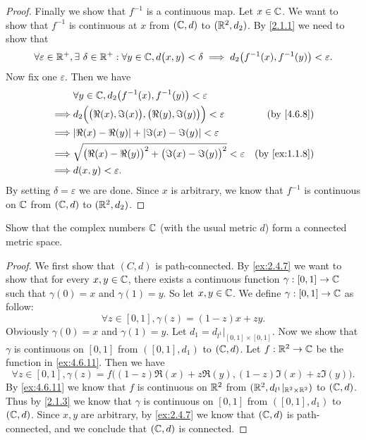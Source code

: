 \begin{proof}
  Finally we show that \(f^{-1}\) is a continuous map.
  Let \(x \in \mathbb{C}\).
  We want to show that \(f^{-1}\) is continuous at \(x\) from \((\mathbb{C}, d)\) to \((\mathbb{R}^2, d_2)\).
  By \cref{2.1.1} we need to show that
  \[
    \forall \varepsilon \in \mathbb{R}^+, \exists\ \delta \in \mathbb{R}^+ : \forall y \in \mathbb{C}, d\big(x, y\big) < \delta \implies d_2\big(f^{-1}(x), f^{-1}(y)\big) < \varepsilon.
  \]
  Now fix one \(\varepsilon\).
  Then we have
  \begin{align*}
             & \forall y \in \C, d_2\big(f^{-1}(x), f^{-1}(y)\big) < \varepsilon                                            \\
    \implies & d_2\Big(\big(\Re(x), \Im(x)\big), \big(\Re(y), \Im(y)\big)\Big) < \varepsilon  & \text{(by \cref{4.6.8})}    \\
    \implies & \abs{\Re(x) - \Re(y)} + \abs{\Im(x) - \Im(y)} < \varepsilon                                                  \\
    \implies & \sqrt{\big(\Re(x) - \Re(y)\big)^2 + \big(\Im(x) - \Im(y)\big)^2} < \varepsilon & \text{(by \cref{ex:1.1.8})} \\
    \implies & d(x, y) < \varepsilon.
  \end{align*}
  By setting \(\delta = \varepsilon\) we are done.
  Since \(x\) is arbitrary, we know that \(f^{-1}\) is continuous on \(\mathbb{C}\) from \((\mathbb{C}, d)\) to \((\mathbb{R}^2, d_2)\).
\end{proof}

\begin{ex}\label{ex:4.6.12}
  Show that the complex numbers \(\mathbb{C}\) (with the usual metric \(d\)) form a connected metric space.
\end{ex}

\begin{proof}
  We first show that \((C, d)\) is path-connected.
  By \cref{ex:2.4.7} we want to show that for every \(x, y \in \mathbb{C}\), there exists a continuous function \(\gamma : [0, 1] \to \mathbb{C}\) such that \(\gamma(0) = x\) and \(\gamma(1) = y\).
  So let \(x, y \in \mathbb{C}\).
  We define \(\gamma : [0, 1] \to \mathbb{C}\) as follow:
  \[
    \forall z \in [0, 1], \gamma(z) = (1 - z)x + zy.
  \]
  Obviously \(\gamma(0) = x\) and \(\gamma(1) = y\).
  Let \(d_1 = d_{l^1}|_{[0, 1] \times [0, 1]}\).
  Now we show that \(\gamma\) is continuous on \([0, 1]\) from \(([0, 1], d_1)\) to \((\mathbb{C}, d)\).
  Let \(f : \mathbb{R}^2 \to \mathbb{C}\) be the function in \cref{ex:4.6.11}.
  Then we have
  \[
    \forall z \in [0, 1], \gamma(z) = f\big((1 - z) \Re(x) + z \Re(y), (1 - z) \Im(x) + z \Im(y)\big).
  \]
  By \cref{ex:4.6.11} we know that \(f\) is continuous on \(\mathbb{R}^2\) from \((\mathbb{R}^2, d_{l^1}|_{\mathbb{R}^2 \times \mathbb{R}^2})\) to \((\mathbb{C}, d)\).
  Thus by \cref{2.1.3} we know that \(\gamma\) is continuous on \([0, 1]\) from \(([0, 1], d_1)\) to \((\mathbb{C}, d)\).
  Since \(x, y\) are arbitrary, by \cref{ex:2.4.7} we know that \((\mathbb{C}, d)\) is path-connected, and we conclude that \((\mathbb{C}, d)\) is connected.
\end{proof}

